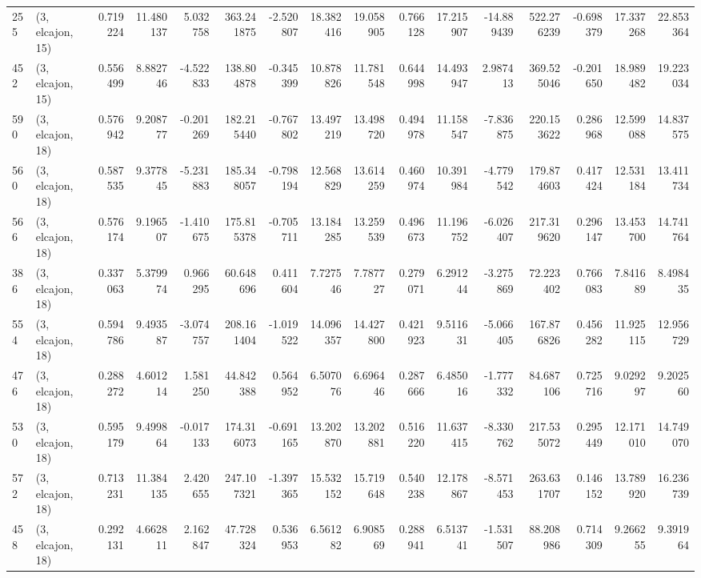 \begin{tabular}{llrrrrrrrrrrrrrr}
255 &  (3, elcajon, 15) &   0.719224 &  11.480137 &   5.032758 &   363.241875 &  -2.520807 &  18.382416 &  19.058905 &  0.766128 &  17.215907 & -14.889439 &    522.276239 &  -0.698379 &  17.337268 &   22.853364 \\
452 &  (3, elcajon, 15) &   0.556499 &   8.882746 &  -4.522833 &   138.804878 &  -0.345399 &  10.878826 &  11.781548 &  0.644998 &  14.493947 &   2.987413 &    369.525046 &  -0.201650 &  18.989482 &   19.223034 \\
590 &  (3, elcajon, 18) &   0.576942 &   9.208777 &  -0.201269 &   182.215440 &  -0.767802 &  13.497219 &  13.498720 &  0.494978 &  11.158547 &  -7.836875 &    220.153622 &   0.286968 &  12.599088 &   14.837575 \\
560 &  (3, elcajon, 18) &   0.587535 &   9.377845 &  -5.231883 &   185.348057 &  -0.798194 &  12.568829 &  13.614259 &  0.460974 &  10.391984 &  -4.779542 &    179.874603 &   0.417424 &  12.531184 &   13.411734 \\
566 &  (3, elcajon, 18) &   0.576174 &   9.196507 &  -1.410675 &   175.815378 &  -0.705711 &  13.184285 &  13.259539 &  0.496673 &  11.196752 &  -6.026407 &    217.319620 &   0.296147 &  13.453700 &   14.741764 \\
386 &  (3, elcajon, 18) &   0.337063 &   5.379974 &   0.966295 &    60.648696 &   0.411604 &   7.727546 &   7.787727 &  0.279071 &   6.291244 &  -3.275869 &     72.223402 &   0.766083 &   7.841689 &    8.498435 \\
554 &  (3, elcajon, 18) &   0.594786 &   9.493587 &  -3.074757 &   208.161404 &  -1.019522 &  14.096357 &  14.427800 &  0.421923 &   9.511631 &  -5.066405 &    167.876826 &   0.456282 &  11.925115 &   12.956729 \\
476 &  (3, elcajon, 18) &   0.288272 &   4.601214 &   1.581250 &    44.842388 &   0.564952 &   6.507076 &   6.696446 &  0.287666 &   6.485016 &  -1.777332 &     84.687106 &   0.725716 &   9.029297 &    9.202560 \\
530 &  (3, elcajon, 18) &   0.595179 &   9.499864 &  -0.017133 &   174.316073 &  -0.691165 &  13.202870 &  13.202881 &  0.516220 &  11.637415 &  -8.330762 &    217.535072 &   0.295449 &  12.171010 &   14.749070 \\
572 &  (3, elcajon, 18) &   0.713231 &  11.384135 &   2.420655 &   247.107321 &  -1.397365 &  15.532152 &  15.719648 &  0.540238 &  12.178867 &  -8.571453 &    263.631707 &   0.146152 &  13.789920 &   16.236739 \\
458 &  (3, elcajon, 18) &   0.292131 &   4.662811 &   2.162847 &    47.728324 &   0.536953 &   6.561282 &   6.908569 &  0.288941 &   6.513741 &  -1.531507 &     88.208986 &   0.714309 &   9.266255 &    9.391964 \\

\end{tabular}
